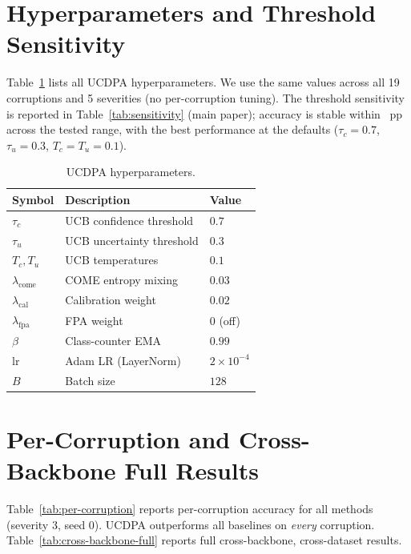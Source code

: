 \appendix

\section{Hyperparameters and Threshold Sensitivity}
\label{app:hyperparameters}

Table~\ref{tab:hyperparameters} lists all UCDPA hyperparameters. We use the same values across all 19 corruptions and 5 severities (no per-corruption tuning). The threshold sensitivity is reported in Table~\ref{tab:sensitivity} (main paper); accuracy is stable within \sensRange{}~pp across the tested range, with the best performance at the defaults ($\tau_c=0.7$, $\tau_u=0.3$, $T_c=T_u=0.1$).

\begin{table}[h]
\centering
\caption{UCDPA hyperparameters.}
\label{tab:hyperparameters}
\begin{tabular}{lll}
\toprule
Symbol & Description & Value \\
\midrule
$\tau_c$ & UCB confidence threshold & $0.7$ \\
$\tau_u$ & UCB uncertainty threshold & $0.3$ \\
$T_c, T_u$ & UCB temperatures & $0.1$ \\
$\lambda_\mathrm{come}$ & COME entropy mixing & $0.03$ \\
$\lambda_\mathrm{cal}$ & Calibration weight & $0.02$ \\
$\lambda_\mathrm{fpa}$ & FPA weight & $0$ (off) \\
$\beta$ & Class-counter EMA & $0.99$ \\
$\mathrm{lr}$ & Adam LR (LayerNorm) & $2 \times 10^{-4}$ \\
$B$ & Batch size & $128$ \\
\bottomrule
\end{tabular}
\end{table}

\section{Per-Corruption and Cross-Backbone Full Results}
\label{app:full-results}
\label{app:per-corruption}
\label{app:cross-backbone}

Table~\ref{tab:per-corruption} reports per-corruption accuracy for all methods (severity 3, seed 0). UCDPA outperforms all baselines on \emph{every} corruption. Table~\ref{tab:cross-backbone-full} reports full cross-backbone, cross-dataset results.

